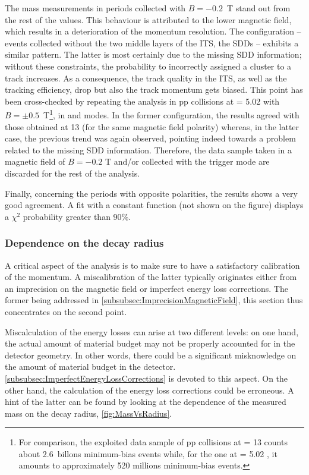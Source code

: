 The mass measurements in periods collected with $B =-0.2$~T stand out from the rest of the values. This behaviour is attributed to the lower magnetic field, which results in a deterioration of the momentum resolution. The  configuration -- \ie events collected without the two middle layers of the ITS, the SDDs -- exhibits a similar pattern. The latter is most certainly due to the missing SDD information; without these constraints, the probability to incorrectly assigned a cluster to a track increases. As a consequence, the track quality in the ITS, as well as the tracking efficiency, drop but also the track momentum gets biased. This point has been cross-checked by repeating the analysis in pp collisions at \sqrtS = 5.02 \tev with $B = \pm 0.5$~T\footnote{For comparison, the exploited data sample of pp collisions at \sqrtS = 13 \tev counts about 2.6~billons minimum-bias events while, for the one at \sqrtS = 5.02 \tev, it amounts to approximately 520 millions minimum-bias events.}, in  and  modes. In the former configuration, the results agreed with those obtained at 13 \tev (for the same magnetic field polarity) whereas, in the latter case, the previous trend was again observed, pointing indeed towards a problem related to the missing SDD information. Therefore, the data sample taken in a magnetic field of $B = -0.2$ T and/or collected with the  trigger mode are discarded for the rest of the analysis.

Finally, concerning the periods with opposite polarities, the results shows a very good agreement. A fit with a constant function (not shown on the figure) displays a $\chi^2$ probability greater than 90\%.

\subsubsection{Dependence on the decay radius}
\label{subsubsec:DecayRadiusDependence}

A critical aspect of the analysis is to make sure to have a satisfactory calibration of the momentum. A miscalibration of the latter typically originates either from an imprecision on the magnetic field or imperfect energy loss corrections. The former being addressed in \Sec\ref{subsubsec:ImprecisionMagneticField}, this section thus concentrates on the second point.

Miscalculation of the energy losses can arise at two different levels: on one hand, the actual amount of material budget may not be properly accounted for in the detector geometry. In other words, there could be a significant misknowledge on the amount of material budget in the detector. \Sec\ref{subsubsec:ImperfectEnergyLossCorrections} is devoted to this aspect. On the other hand, the calculation of the energy loss corrections could be erroneous. A hint of the latter can be found by looking at the dependence of the measured mass on the decay radius, \fig\ref{fig:MassVsRadius}.\\

